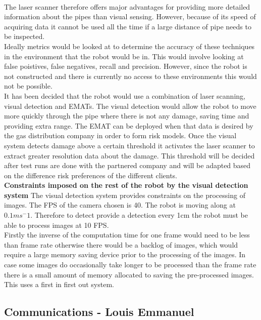 \documentclass[11pt]{article}		%
\begin{document}
        \\
        The laser scanner therefore offers major advantages for providing more detailed information about the pipes than visual sensing. 
        However, because of its speed of acquiring data it cannot be used all the time if a large distance of pipe needs to be inspected.
        \\
        Ideally metrics would be looked at to determine the accuracy of these techniques in the environment that the robot would be in. 
        This would involve looking at false poistives, false negatives, recall and precision.
        However, since the robot is not constructed and there is currently no access to these environments this would not be possible.
        \\
        It has been decided that the robot would use a combination of laser scanning, visual detection and EMATs.
        The visual detection would allow the robot to move more quickly through the pipe where there is not any damage, saving time and providing extra range. 
        The EMAT can be deployed when that data is desired by the gas distribution company in order to form risk models. 
        Once the visual system detects damage  above a certain threshold it activates the laser scanner to extract greater resolution data about the damage. 
        This threshold will be decided after test runs are done with the partnered company and will be adapted based on the difference risk preferences of the different clients.
    	\\
        \textbf{Constraints imposed on the rest of the robot by the visual detection system}
        The visual detection system provides constraints on the processing of images. The FPS of the camera chosen is 40.
        The robot is moving along at $0.1ms^-1$. 
        Therefore to detect provide a detection every 1cm the robot must be able to process images at 10 FPS.
        \\
        Firstly the inverse of the computation time for one frame would need to be less than frame rate otherwise there would be a backlog of images, which would require a large memory saving device prior to the processing of the images. 
        In case some images do occasionally take longer to be processed than the frame rate there is a small amount of memory allocated to saving the pre-processed images. 
        This uses a first in first out system.

		\subsection[Communications]{Communications - Louis Emmanuel}
\end{document}
